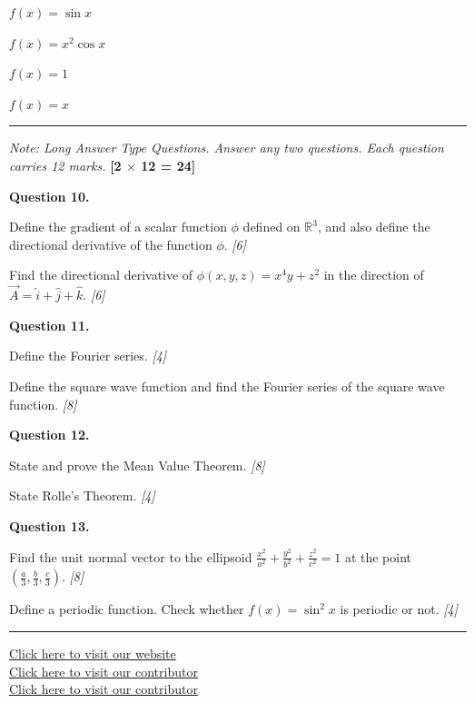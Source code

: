 \documentclass[11pt,a4paper]{article}
\newcommand{\pts}[1]{\hfill   \textit{[#1]}}
\begin{document}
\begin{parts}
  \item $f(x) = \sin x$
  \item $f(x) = x^2 \cos x$
  \item $f(x) = 1$
  \item $f(x) = x$
\end{parts}

\bigskip


\rule{\linewidth}{0.4pt}\smallskip




\noindent   \textit{Note: Long Answer Type Questions. Answer any two questions. Each question carries 12 marks.} \hfill   \textbf{[2 $ \times$ 12 = 24]}

\medskip


\noindent   \textbf{Question 10.}

\begin{parts}
  \item Define the gradient of a scalar function $\phi$ defined on $\mathbb{R}^3$, and also define the directional derivative of the function $\phi$. \pts{6}
  \item Find the directional derivative of $\phi(x, y, z) = x^4 y + z^2$ in the direction of $\vec{A} = \hat{i} + \hat{j} + \hat{k}$. \pts{6}
\end{parts}

\medskip


\noindent   \textbf{Question 11.}

\begin{parts}
  \item Define the Fourier series. \pts{4}
  \item Define the square wave function and find the Fourier series of the square wave function. \pts{8}
\end{parts}

\medskip


\noindent   \textbf{Question 12.}

\begin{parts}
  \item State and prove the Mean Value Theorem. \pts{8}
  \item State Rolle's Theorem. \pts{4}
\end{parts}

\medskip


\noindent   \textbf{Question 13.}

\begin{parts}
  \item Find the unit normal vector to the ellipsoid $\frac{x^2}{a^2} + \frac{y^2}{b^2} + \frac{z^2}{c^2} = 1$ at the point $\left(\frac{a}{3}, \frac{b}{3}, \frac{c}{3}\right)$. \pts{8}
  \item Define a periodic function. Check whether $f(x) = \sin^2 x$ is periodic or not. \pts{4}
\end{parts}

\vfill
\rule{\linewidth}{0.4pt}

\begin{center}\small
\href{https://bhu-exam.vercel.app/}{Click here to visit our website}\\[4pt]\href{https://me-aryan.vercel.app/}{Click here to visit our contributor}\\[4pt]\href{https://quashan-me.vercel.app/}{Click here to visit our contributor}
\end{center}
\end{document}
